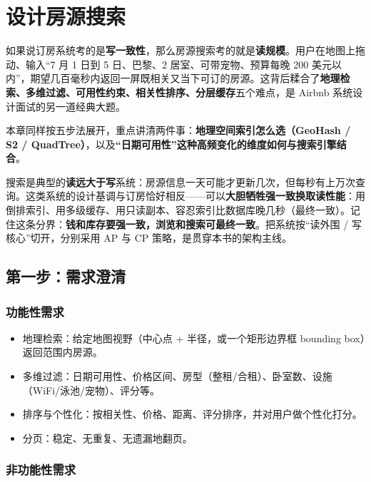 \chapter{设计房源搜索}

如果说订房系统考的是\textbf{写一致性}，那么房源搜索考的就是\textbf{读规模}。用户在地图上拖动、输入“7 月 1 日到 5 日、巴黎、2 居室、可带宠物、预算每晚 200 美元以内”，期望几百毫秒内返回一屏既相关又当下可订的房源。这背后糅合了\textbf{地理检索、多维过滤、可用性约束、相关性排序、分层缓存}五个难点，是 Airbnb 系统设计面试的另一道经典大题。

本章同样按五步法展开，重点讲清两件事：\textbf{地理空间索引怎么选（GeoHash / S2 / QuadTree）}，以及\textbf{“日期可用性”这种高频变化的维度如何与搜索引擎结合}。

\begin{idea}[读多写少系统的设计基调]
搜索是典型的\textbf{读远大于写}系统：房源信息一天可能才更新几次，但每秒有上万次查询。这类系统的设计基调与订房恰好相反——可以\textbf{大胆牺牲强一致换取读性能}：用倒排索引、用多级缓存、用只读副本、容忍索引比数据库晚几秒（最终一致）。记住这条分界：\textbf{钱和库存要强一致，浏览和搜索可最终一致}。把系统按“读外围 / 写核心”切开，分别采用 AP 与 CP 策略，是贯穿本书的架构主线。
\end{idea}

\section{第一步：需求澄清}

\subsection{功能性需求}

\begin{itemize}
  \item 地理检索：给定地图视野（中心点 + 半径，或一个矩形边界框 bounding box）返回范围内房源。
  \item 多维过滤：日期可用性、价格区间、房型（整租/合租）、卧室数、设施（WiFi/泳池/宠物）、评分等。
  \item 排序与个性化：按相关性、价格、距离、评分排序，并对用户做个性化打分。
  \item 分页：稳定、无重复、无遗漏地翻页。
\end{itemize}

\subsection{非功能性需求}

